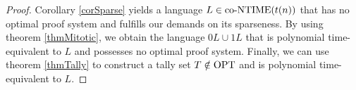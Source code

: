   \begin{proof}
    Corollary \ref{corSparse} yields a language \(L \in \text{co-NTIME}(t(n))\) that has no optimal proof system and fulfills our demands on its sparseness. By using theorem \ref{thmMitotic}, we obtain the language \(0L \cup 1L\) that is polynomial time-equivalent to \(L\) and possesses no optimal proof system. Finally, we can use theorem \ref{thmTally} to construct a tally set \(T \notin \text{OPT}\) and is polynomial time-equivalent to \(L\). 
  \end{proof}



 

  